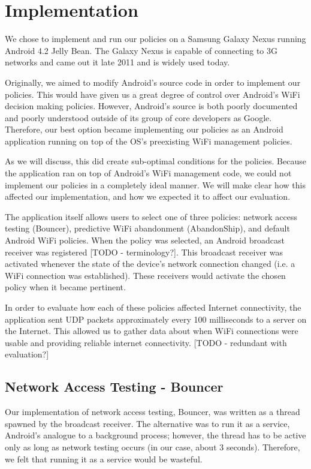 \section{Implementation}
\label{sec:impl}

We chose to implement and run our policies on a Samsung Galaxy Nexus running Android 4.2 Jelly Bean. The Galaxy Nexus is capable of connecting to 3G networks and came out it late 2011 and is widely used today.

Originally, we aimed to modify Android's source code in order to implement our policies. This would have given us a great degree of control over Android's WiFi decision making policies. However, Android's source is both poorly documented and poorly understood outside of its group of core developers as Google. Therefore, our best option became implementing our policies as an Android application running on top of the OS's preexisting WiFi management policies.

As we will discuss, this did create sub-optimal conditions for the policies. Because the application ran on top of Android's WiFi management code, we could not implement our policies in a completely ideal manner. We will make clear how this affected our implementation, and how we expected it to affect our evaluation.

The application itself allows users to select one of three policies: network access testing (Bouncer), predictive WiFi abandonment (AbandonShip), and default Android WiFi policies. When the policy was selected, an Android broadcast receiver was registered [TODO - terminology?]. This broadcast receiver was activated whenever the state of the device's network connection changed (i.e. a WiFi connection was established). These receivers would activate the chosen policy when it became pertinent.

In order to evaluate how each of these policies affected Internet connectivity, the application sent UDP packets approximately every 100 milliseconds to a server on the Internet. This allowed us to gather data about when WiFi connections were usable and providing reliable internet connectivity. [TODO - redundant with evaluation?]

\subsection{Network Access Testing - Bouncer}
Our implementation of network access testing, Bouncer, was written as a thread spawned by the broadcast receiver. The alternative was to run it as a service, Android's analogue to a background process; however, the thread has to be active only as long as network testing occurs (in our case, about 3 seconds). Therefore, we felt that running it as a service would be wasteful.

